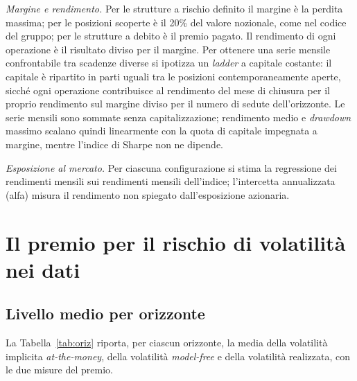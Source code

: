 \documentclass[11pt,a4paper]{article}
\begin{document}
\emph{Margine e rendimento.} Per le strutture a rischio definito il margine è la perdita massima; per le posizioni scoperte è il 20\% del valore nozionale, come nel codice del gruppo; per le strutture a debito è il premio pagato. Il rendimento di ogni operazione è il risultato diviso per il margine. Per ottenere una serie mensile confrontabile tra scadenze diverse si ipotizza un \emph{ladder} a capitale costante: il capitale è ripartito in parti uguali tra le posizioni contemporaneamente aperte, sicché ogni operazione contribuisce al rendimento del mese di chiusura per il proprio rendimento sul margine diviso per il numero di sedute dell'orizzonte. Le serie mensili sono sommate senza capitalizzazione; rendimento medio e \emph{drawdown} massimo scalano quindi linearmente con la quota di capitale impegnata a margine, mentre l'indice di Sharpe non ne dipende.

\emph{Esposizione al mercato.} Per ciascuna configurazione si stima la regressione dei rendimenti mensili sui rendimenti mensili dell'indice; l'intercetta annualizzata (alfa) misura il rendimento non spiegato dall'esposizione azionaria.

\section{Il premio per il rischio di volatilità nei dati}\label{sec:vrp}

\subsection{Livello medio per orizzonte}

La Tabella~\ref{tab:oriz} riporta, per ciascun orizzonte, la media della volatilità implicita \emph{at-the-money}, della volatilità \emph{model-free} e della volatilità realizzata, con le due misure del premio.
\end{document}

